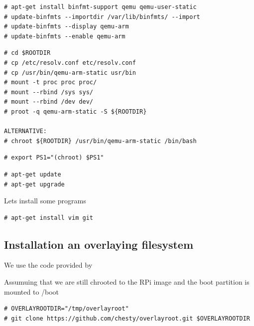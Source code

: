 

\begin{lstlisting}[]
# apt-get install binfmt-support qemu qemu-user-static
# update-binfmts --importdir /var/lib/binfmts/ --import
# update-binfmts --display qemu-arm
# update-binfmts --enable qemu-arm
\end{lstlisting}
\FloatBarrier

\begin{lstlisting}[]
# cd $ROOTDIR
# cp /etc/resolv.conf etc/resolv.conf
# cp /usr/bin/qemu-arm-static usr/bin
# mount -t proc proc proc/
# mount --rbind /sys sys/
# mount --rbind /dev dev/
# proot -q qemu-arm-static -S ${ROOTDIR}

ALTERNATIVE:
# chroot ${ROOTDIR} /usr/bin/qemu-arm-static /bin/bash
\end{lstlisting}
\FloatBarrier


\begin{lstlisting}[]
# export PS1="(chroot) $PS1"
\end{lstlisting}
\FloatBarrier



\begin{lstlisting}[]
# apt-get update
# apt-get upgrade
\end{lstlisting}
\FloatBarrier

Lets install some programs
\begin{lstlisting}[]
# apt-get install vim git
\end{lstlisting}
\FloatBarrier



\subsection{Installation an overlaying filesystem}

We use the code provided by

Assumuing that we are still chrooted to the RPi image and the boot partition is mounted to /boot

\begin{lstlisting}[]
# OVERLAYROOTDIR="/tmp/overlayroot"
# git clone https://github.com/chesty/overlayroot.git $OVERLAYROOTDIR
\end{lstlisting}
\FloatBarrier

